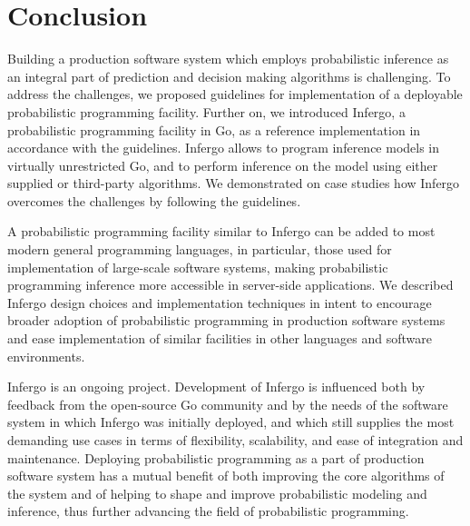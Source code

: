 \documentclass[sigplan,review,10pt,anonymous]{acmart}
\begin{document}
\begin{sloppypar}
\section{Conclusion}

Building a production software system which employs
probabilistic inference as an integral part of prediction and
decision making algorithms is challenging. To address the
challenges, we proposed guidelines for implementation of a
deployable probabilistic programming facility. Further on, we
introduced Infergo, a probabilistic programming facility in Go,
as a reference implementation in accordance with the guidelines.
Infergo allows to program inference models in virtually
unrestricted Go, and to perform inference on the model using
either supplied or third-party algorithms. We demonstrated on
case studies how Infergo overcomes the challenges by following
the guidelines.

A probabilistic programming facility similar to Infergo can be
added to most modern general programming languages, in
particular, those used for implementation of large-scale software
systems, making probabilistic programming inference more
accessible in server-side applications. We described Infergo
design choices and implementation techniques in intent to
encourage broader adoption of probabilistic programming in
production software systems and ease implementation of similar
facilities in other languages and software environments.

Infergo is an ongoing project. Development of Infergo is
influenced both by feedback from the open-source Go community
and by the needs of the software system in which Infergo was
initially deployed, and which still supplies the most demanding
use cases in terms of flexibility, scalability, and ease of
integration and maintenance. Deploying probabilistic programming
as a part of production software system has a mutual benefit of
both improving the core algorithms of the system and of helping
to shape and improve probabilistic modeling and inference, thus
further advancing the field of probabilistic programming.

\end{sloppypar}


\end{document}
